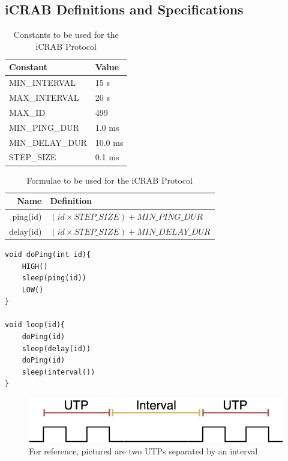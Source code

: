 \documentclass[12pt,hidelinks]{article}
\begin{document}
\newpage
\subsection{iCRAB Definitions and Specifications} \label{specs}

\begin{table}[ht]
\centering
\begin{tabular}{|l|l|}
\hline
Constant & Value \\
\hline
MIN\_INTERVAL	&	15 s		\\
MAX\_INTERVAL	&	20 s		\\
MAX\_ID			&	499		\\
MIN\_PING\_DUR	&	1.0 ms	\\
MIN\_DELAY\_DUR	&	10.0 ms	\\
STEP\_SIZE		&	0.1	ms	\\
\hline
\end{tabular}
\caption{Constants to be used for the iCRAB Protocol}\label{table:constants}
\end{table}

\begin{table}[ht]
\centering
\begin{tabular}{|r|l|}
\hline
Name & Definition \\
\hline
ping(id)		&	$(id \times STEP\_SIZE)+MIN\_PING\_DUR$	\\
delay(id)	&	$(id \times STEP\_SIZE)+MIN\_DELAY\_DUR$	\\
\hline
\end{tabular}
\caption{Formulae to be used for the iCRAB Protocol}\label{table:formulae}
\end{table}

\begin{lstlisting}[caption={Transmitter Behavior},label={lst:tx}]
void doPing(int id){
	HIGH()
	sleep(ping(id))
	LOW()
}

void loop(id){
	doPing(id)
	sleep(delay(id))
	doPing(id)
	sleep(interval())
}
\end{lstlisting}

\begin{figure}[h]
\centering
\includegraphics[scale=0.5]{interval}

\caption{For reference, pictured are two UTPs separated by an interval}
\label{fig:interval}
\end{figure}
\end{document}
